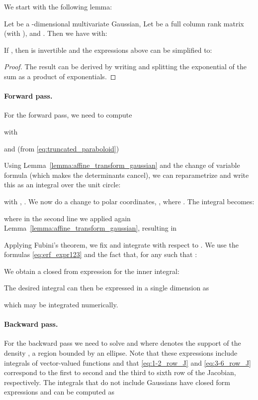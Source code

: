 \documentclass{article}
\begin{document}
We start with the following lemma:

\smallskip

\begin{lemma}\label{lemma:affine_transform_gaussian}
Let  be a -dimensional multivariate Gaussian, 
Let  be a full column rank matrix (with ), and . 
Then we have  with:

If , then  is invertible and the expressions above can be simplified to:

\end{lemma}

\begin{proof}
The result can be derived by writing  and splitting the exponential of the sum as a product of exponentials.
\end{proof}

\paragraph{Forward pass.}
For the forward pass, we need to compute

with

and (from \eqref{eq:truncated_paraboloid})

Using Lemma~\ref{lemma:affine_transform_gaussian} and  the change of variable formula (which makes the determinants cancel), we can reparametrize  and write this as an integral over the unit circle:

with , 
. 
We now do a change to polar coordinates, , where . The integral becomes:

where in the second line we applied again Lemma~\ref{lemma:affine_transform_gaussian}, resulting in 

Applying Fubini's theorem, 
we fix  and integrate with respect to . We use the formulas \eqref{eq:erf_expr123} and the fact that, for any  such that :

We obtain a closed from expression for the inner integral:

The desired integral can then be expressed in a single dimension as 

which may be integrated numerically.



\paragraph{Backward pass.}

For the backward pass we need to solve
and 
 where  denotes the support of the density , a region bounded by an ellipse. 
Note that these expressions include integrals of vector-valued functions and that \eqref{eq:1-2_row_J} and \eqref{eq:3-6_row_J} correspond to the first to second and the third to sixth row of the Jacobian, respectively. The integrals that do not include Gaussians have closed form expressions and can be computed as
\end{document}
